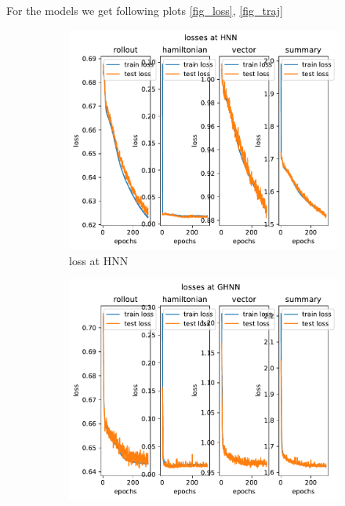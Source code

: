 For the models we get following plots \ref{fig_loss}, \ref{fig_traj}\
\begin{figure}[H]
	\centering
	\begin{subfigure}[b]{0.3\textwidth}
		\centering
		\includegraphics[width=\textwidth]{chapters/chapter5/fig_hnn_loss.pdf}
		\caption{loss at HNN}
	\end{subfigure}
	\hfill
	\begin{subfigure}[b]{0.3\textwidth}
		\centering
		\includegraphics[width=\textwidth]{chapters/chapter5/fig_ghnn_loss.pdf}

\end{subfigure}
\end{figure}
